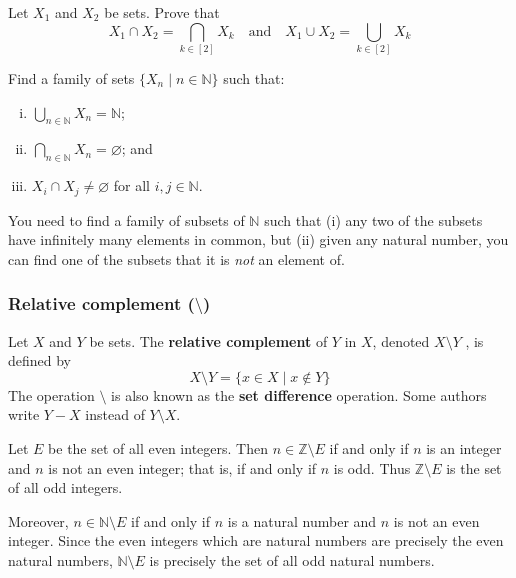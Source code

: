 \begin{exercise}
\label{exIndexedIntersectionUnionGeneralisePairwise}
Let $X_1$ and $X_2$ be sets. Prove that
\[ X_1 \cap X_2 = \bigcap_{k \in [2]} X_k \quad \text{and} \quad X_1 \cup X_2 = \bigcup_{k \in [2]} X_k \]
\end{exercise}

\begin{exercise}
\label{exSubsetsFiniteIntersectionInhabitedInfiniteIntersectionEmpty}
Find a family of sets $\{ X_n \mid n \in \mathbb{N} \}$ such that:
\begin{enumerate}[(i)]
\item $\displaystyle\bigcup_{n \in \mathbb{N}} X_n = \mathbb{N}$;
\item $\displaystyle\bigcap_{n \in \mathbb{N}} X_n = \varnothing$; and
\item $X_i \cap X_j \ne \varnothing$ for all $i,j \in \mathbb{N}$.
\end{enumerate}
\begin{backhint}
You need to find a family of subsets of $\mathbb{N}$ such that (i) any two of the subsets have infinitely many elements in common, but (ii) given any natural number, you can find one of the subsets that it is \textit{not} an element of.
\end{backhint}
\end{exercise}

\subsubsection*{Relative complement ($\setminus$)}

\begin{definition}
\label{defRelativeComplement}
Let $X$ and $Y$ be sets. The \textbf{relative complement} of $Y$ in $X$, denoted $X \setminus Y$ , is defined by
\[ X \setminus Y = \{ x \in X \mid x \not \in Y \} \]
The operation $\setminus$ is also known as the \textbf{set difference} operation. Some authors write $Y - X$ instead of $Y \setminus X$.
\end{definition}

\begin{example}
Let $E$ be the set of all even integers. Then $n \in \mathbb{Z} \setminus E$ if and only if $n$ is an integer and $n$ is not an even integer; that is, if and only if $n$ is odd. Thus $\mathbb{Z} \setminus E$ is the set of all odd integers.

Moreover, $n \in \mathbb{N} \setminus E$ if and only if $n$ is a natural number and $n$ is not an even integer. Since the even integers which are natural numbers are precisely the even natural numbers, $\mathbb{N} \setminus E$ is precisely the set of all odd natural numbers.
\end{example}

